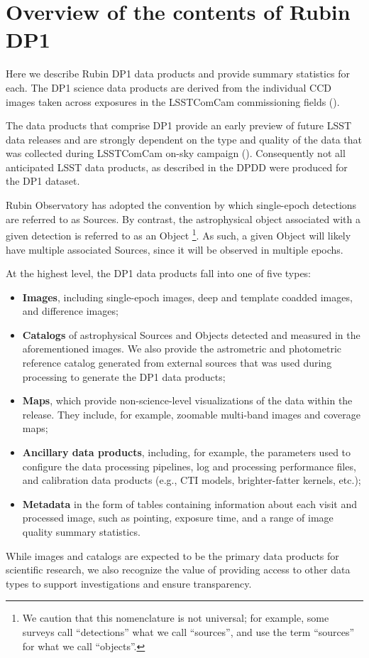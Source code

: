 \section{Overview of the contents of Rubin DP1}
\label{sec:data_products}
Here we describe Rubin \gls{DP1} data products and provide summary statistics for each.
The \gls{DP1} science data products are derived from the \nvisitimages individual \gls{CCD} images taken across \nexposures exposures in the \nfields \gls{LSSTComCam} commissioning fields ().

The data products that comprise \gls{DP1} provide an early preview of future LSST data releases and are strongly dependent on the type and quality of the data that was collected during \gls{LSSTComCam} on-sky campaign ().
Consequently not all anticipated  \gls{LSST} data products, as described in the \gls{DPDD} \citep{LSE-163} were produced for the \gls{DP1} dataset.

Rubin Observatory has adopted the convention by which single-epoch detections are referred to as Sources.
By contrast, the astrophysical object associated with a given detection is referred to as an Object
\footnote{We caution that this nomenclature is not universal; for example, some surveys call ``detections'' what we call ``sources'', and use the term ``sources'' for what we call ``objects''.}.
As such, a given Object will likely have multiple associated  Sources, since it will be observed in multiple epochs.

At the highest level, the \gls{DP1} data products fall into one of five types:
\begin{itemize}
\item \textbf{Images}, including single-\gls{epoch} images, deep and template coadded images, and difference images;
\item \textbf{Catalogs} of astrophysical Sources and Objects detected and measured in the aforementioned images. We also provide the astrometric and photometric reference catalog generated from external sources that was used during processing to generate the \gls{DP1} data products;
\item \textbf{Maps}, which provide non-science-level visualizations of the data within the release. They include, for example, zoomable multi-band images and coverage maps;
\item \textbf{Ancillary data products}, including, for example, the parameters used to configure the data processing pipelines, log and processing performance files,  and \gls{calibration} data products (e.g., \gls{CTI} models, brighter-fatter kernels, etc.);
\item \textbf{Metadata} in the form of tables containing information about each visit and processed image, such as pointing, exposure time, and a range of image quality summary statistics.
\end{itemize}
While images and catalogs are expected to be the primary data products for scientific research, we also recognize the value of providing access to other data types to support investigations and ensure transparency.

